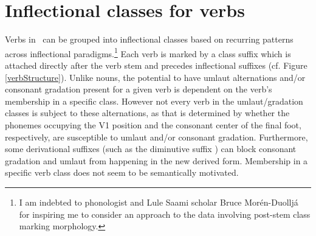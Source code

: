 \afterpage{\clearpage}



\section{Inflectional classes for verbs}\label{verbInflectionalClasses}
Verbs in \PS\ can be grouped into inflectional classes based on recurring patterns across inflectional paradigms.\footnote{I am indebted to phonologist and Lule Saami scholar Bruce Morén-Duolljá for inspiring me to consider an approach to the data involving post-stem class marking morphology.} 
Each verb is marked by a class suffix which is attached directly after the verb stem and precedes inflectional suffixes (cf. Figure \vref{verbStructure}). %
Unlike nouns, the potential to have umlaut alternations and/or consonant gradation present for a given verb is dependent on the verb’s membership in a specific class. However not every verb in the umlaut/gradation classes is subject to these alternations, as that is determined by whether the phonemes occupying the V1 position and the consonant center of the final foot, respectively, are susceptible to umlaut and/or consonant gradation. 
Furthermore, some derivational suffixes (such as the diminutive suffix ) can block consonant gradation and umlaut from happening in the new derived form. 
Membership in a specific verb class does not seem to be semantically motivated. %

